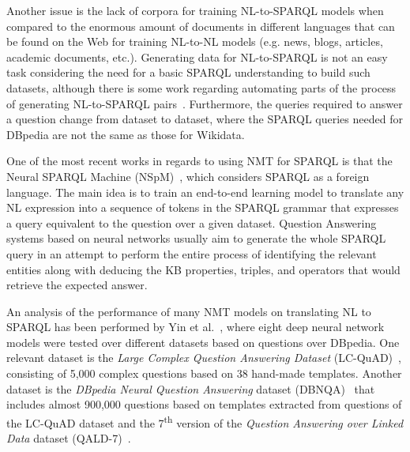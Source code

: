 Another issue is the lack of corpora for training NL-to-SPARQL models when compared to 
the enormous amount of documents in different languages that can be found on the Web for 
training NL-to-NL models (e.g. news, blogs, articles, academic documents, etc.). Generating 
data for NL-to-SPARQL is not an easy task considering the need for a basic SPARQL understanding 
to build such datasets, although there is some work regarding automating parts 
of the process of generating NL-to-SPARQL pairs~\cite{dataset:dbnqa-hartmann-marx-soru-2018, dataset:lcquad-TrivediMDL17}. 
Furthermore, the queries required to answer a question change from dataset to dataset, where the SPARQL queries needed for 
DBpedia are not the same as those for Wikidata.

One of the most recent works in regards to using NMT for SPARQL is that 
the Neural SPARQL Machine (NSpM)~\cite{nmt:nspm-SoruMMPVEN17}, which considers SPARQL as a foreign language. 
The main idea is to train an end-to-end learning model to translate any NL expression 
into a sequence of tokens in the SPARQL grammar that expresses a query equivalent to the 
question over a given dataset. Question Answering systems based on neural networks usually 
aim to generate the whole SPARQL query in an attempt to perform the entire process of 
identifying the relevant entities along with deducing the KB properties, triples, and operators 
that would retrieve the expected answer. 

An analysis of the performance of many NMT models on translating NL to SPARQL 
has been performed by Yin et al.~\cite{nmt:nl-to-sparql-Yin19}, where eight deep neural network models were tested 
over different datasets based on questions over DBpedia. One relevant dataset is the \textit{Large 
Complex Question Answering Dataset} (LC-QuAD)~\cite{dataset:lcquad-TrivediMDL17}, consisting of 5,000 complex questions 
based on 38 hand-made templates. Another dataset is the \textit{DBpedia Neural Question Answering} 
dataset (DBNQA)~\cite{dataset:dbnqa-hartmann-marx-soru-2018} that includes almost 900,000 questions based on templates extracted 
from questions of the LC-QuAD dataset and the 7\textsuperscript{th} version of the \textit{Question Answering over 
Linked Data} dataset (QALD-7)~\cite{dataset:qald7-UsbeckNHKRN17}.

